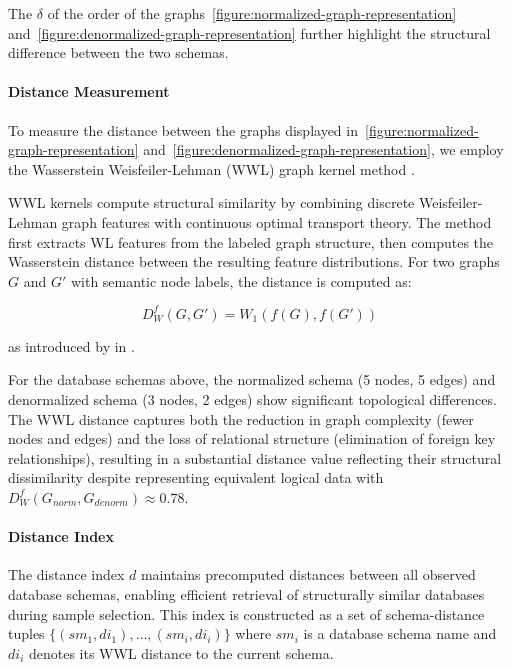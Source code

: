 The $\delta$ of the order of the graphs~\ref{figure:normalized-graph-representation}
and~\ref{figure:denormalized-graph-representation}
further highlight the structural difference between the two schemas.

\paragraph{Distance Measurement}

To measure the distance between the graphs displayed in~\ref{figure:normalized-graph-representation}
and~\ref{figure:denormalized-graph-representation}, we employ the
Wasserstein Weisfeiler-Lehman (WWL) graph kernel method \citep{WWL}.

WWL kernels compute structural similarity by combining discrete Weisfeiler-Lehman
graph features with continuous optimal transport theory. The method first extracts
WL features from the labeled graph structure, then computes the Wasserstein distance
between the resulting feature distributions. For two graphs $G$ and
$G'$ with semantic node labels, the distance is computed as:

\begin{equation}
D^{f}_{W}(G, G') = W_1(f(G), f(G'))
\end{equation}

as introduced by \citeauthor{WWL} in \citeyear{WWL}.



For the database schemas above, the normalized schema (5 nodes, 5 edges) and
denormalized schema (3 nodes, 2 edges) show significant topological differences.
The WWL distance captures both the reduction in graph complexity (fewer nodes and edges)
and the loss of relational structure (elimination of foreign key relationships),
resulting in a substantial distance value reflecting their structural dissimilarity
despite representing equivalent logical data with $D^{f}_{W}(G_{norm}, G_{denorm}) \approx 0.78$.


\paragraph{Distance Index}

The distance index $d$ maintains precomputed distances between
all observed database schemas, enabling efficient retrieval of structurally similar
databases during sample selection. This index is constructed as a set of
schema-distance tuples $\{(sm_1, di_1), \ldots, (sm_i, di_i)\}$ where $sm_i$ is
a database schema name and $di_i$ denotes its WWL distance to the current schema.

